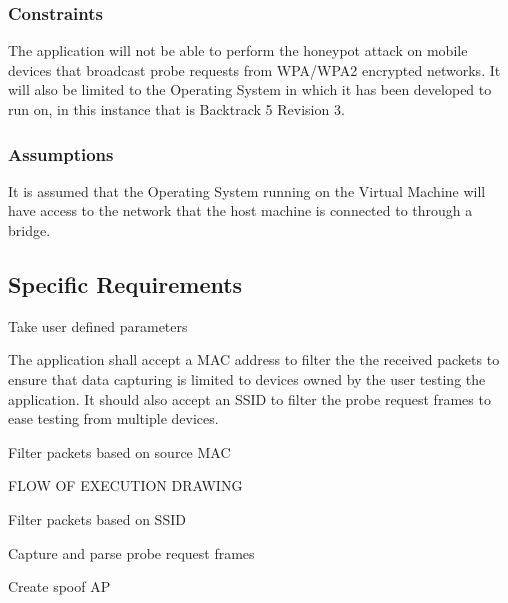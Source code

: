 \subsubsection{Constraints}
The application will not be able to perform the honeypot attack on mobile devices that broadcast probe requests from WPA/WPA2 encrypted networks. It will also be limited to the Operating System in which it has been developed to run on, in this instance that is Backtrack 5 Revision 3.

\subsubsection{Assumptions}
It is assumed that the Operating System running on the Virtual Machine will have access to the network that the host machine is connected to through a bridge.

\subsection{Specific Requirements}
Take user defined parameters

The application shall accept a MAC address to filter the the received packets to ensure that data capturing is limited to devices owned by the user testing the application. It should also accept an SSID to filter the probe request frames to ease testing from multiple devices.
 
Filter packets based on source MAC

FLOW OF EXECUTION DRAWING


Filter packets based on SSID

Capture and parse probe request frames

Create spoof AP
\clearpage